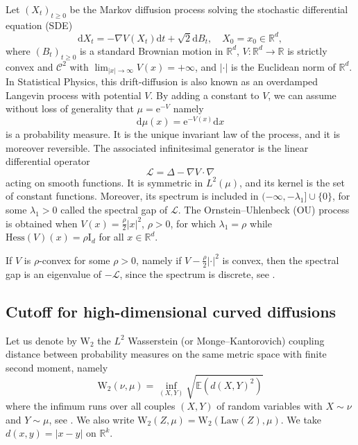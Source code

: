 \documentclass[10pt,reqno]{amsart}
\numberwithin{equation}{section}
\begin{document}
Let ${(X_t)}_{t\geq0}$ be the Markov diffusion process solving the stochastic differential equation (SDE)
\begin{equation} \label{eq:eds}
\mathrm{d}X_t = -\nabla V(X_t)\mathrm{d}t + \sqrt{2}\mathrm{d}B_t,
\quad X_0=x_0\in\mathbb{R}^d,
\end{equation}
where ${(B_t)}_{t\geq0}$ is a standard Brownian motion in $\mathbb{R}^d$, $V:\mathbb{R}^d\to\mathbb{R}$ is strictly convex and $\mathscr{C}^2$ with
$\lim_{|x|\to\infty}V(x)=+\infty$, and $\left|\cdot\right|$ is the Euclidean norm of $\mathbb{R}^d$. In Statistical Physics, this drift-diffusion is also known as an overdamped Langevin process with potential $V$. By adding a constant to $V$, we can assume without loss of generality that 
$\mu=\mathrm{e}^{-V}$ namely
\begin{equation}\label{eq:mu}
\mathrm{d}\mu(x)=\mathrm{e}^{-V(x)}\mathrm{d}x
\end{equation}
is a probability measure. It is the unique invariant law of the process, and it is moreover reversible. The associated infinitesimal generator is the linear differential operator 
\begin{equation}\label{eq:L}
\mathcal{L} = \Delta - \nabla V \cdot \nabla
\end{equation}
acting on smooth functions. It is symmetric in $L^2(\mu)$, and its kernel is
the set of constant functions. Moreover, its spectrum is included in
$(-\infty,-\lambda_1]\cup\{0\}$, for some $\lambda_1>0$ called the spectral
gap of $\mathcal{L}$. The Ornstein--Uhlenbeck (OU) process is obtained
when $V(x)=\frac{\rho}{2}|x|^2$, $\rho>0$, for which $\lambda_1=\rho$ while
$\mathrm{Hess}(V)(x)=\rho \mathrm{I}_d$ for all $x\in\mathbb{R}^d$.

If $V$ is $\rho$-convex for some $\rho>0$, namely if
$V-\frac{\rho}{2}\left|\cdot\right|^2$ is convex, then the spectral gap is an
eigenvalue of $-\mathcal{L}$, since the spectrum is discrete, see \cite[Prop.~6.7]{GMS15}.

\subsection{Cutoff for high-dimensional curved diffusions}

Let us denote by $\mathrm{W}_2$ the $L^2$ Wasserstein (or
Monge--Kantorovich) coupling distance between probability measures on the
same metric space with finite second moment, namely
\begin{equation}
  \mathrm{W}_2(\nu,\mu)=\inf_{(X,Y)}\sqrt{\mathbb{E}(d(X,Y)^2)}
\end{equation}
where the infimum runs over all couples $(X,Y)$ of random variables with
$X\sim\nu$ and $Y\sim\mu$, see \cite{MR3409718}. We also write
$\mathrm{W}_2(Z,\mu)=\mathrm{W}_2(\mathrm{Law}(Z),\mu)$. We take
$d(x,y)=|x-y|$ on $\mathbb{R}^k$.
\end{document}
